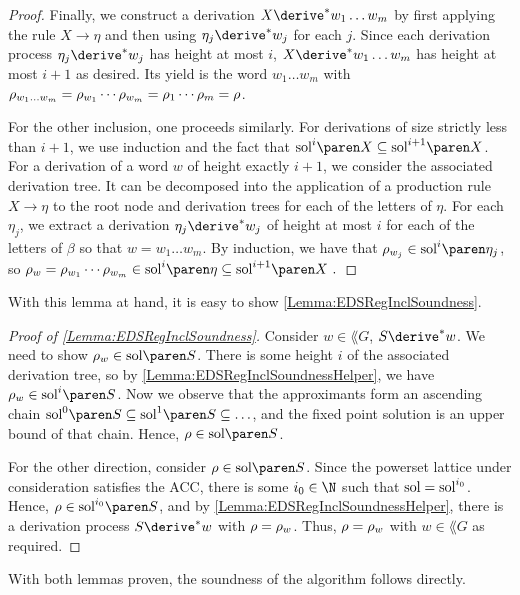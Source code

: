 \documentclass[../../diss.tex]{subfiles}
\begin{document}
\begin{proof}
    Finally, we construct a derivation $X \derive^* w_1 \ldots w_m$ by first applying the rule $X \to \eta$ and then using $\eta_j \derive^* w_j$ for each $j$.
    Since each derivation process $\eta_j \derive^* w_j$ has height at most $i$, $X \derive^* w_1 \ldots w_m$ has height at most $i+1$ as desired.
    Its yield is the word $w_1 \ldots w_m$ with $\tbox{w_1 \ldots w_m} = \tbox{w_1} \cdots \tbox{w_m} = \tbox_1 \cdots \tbox_m = \tbox$.

    For the other inclusion, one proceeds similarly.
    For derivations of size strictly less than $i+1$, we use induction and the fact that $\sol{i}{X} \subseteq \sol{i+1}{X}$.
    For a derivation of a word $w$ of height exactly $i+1$, we consider the associated derivation tree.
    It can be decomposed into the application of a production rule $X \to \eta$ to the root node and derivation trees for each of the letters of $\eta$.
    For each $\eta_j$, we extract a derivation $\eta_j \derive^* w_j$ of height at most $i$ for each of the letters of $\beta$ so that $w = w_1 \ldots w_m$.
    By induction, we have that $\tbox{w_j} \in \sol{i}{\eta_j}$, so
    \(
        \tbox{w} = \tbox{w_1} \cdots \tbox{w_m} \in \sol{i}{\eta} \subseteq \sol{i+1}{X}
        \ .
    \)
\end{proof}

With this lemma at hand, it is easy to show \cref{Lemma:EDSRegInclSoundness}.

\begin{proof}[Proof of \cref{Lemma:EDSRegInclSoundness}]
    Consider $w \in \lang{G}$, \ie $S \derive^* w$.
    We need to show $\tbox{w} \in \sol{S}$.
    There is some height $i$ of the associated derivation tree, so by \cref{Lemma:EDSRegInclSoundnessHelper}, we have $\tbox{w} \in \sol{i}{S}$.
    Now we observe that the approximants form an ascending chain $\sol{0}{S} \subseteq \sol{1}{S} \subseteq \ldots$, and the fixed point solution is an upper bound of that chain.
    Hence, $\tbox \in \sol{S}$.

    For the other direction, consider $\tbox \in \sol{S}$.
    Since the powerset lattice under consideration satisfies the ACC, there is some $i_0 \in \N$ such that $\sol = \soli{i_0}$.
    Hence, $\tbox \in \sol{i_0}{S}$, and by \cref{Lemma:EDSRegInclSoundnessHelper}, there is a derivation process $S \derive^* w$ with $\tbox = \tbox{w}$.
    Thus, $\tbox = \tbox{w}$ with $w \in \lang{G}$ as required.
\end{proof}

With both lemmas proven, the soundness of the algorithm follows directly.
\end{document}
